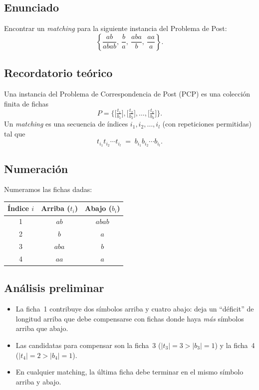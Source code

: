 \documentclass[11pt,a4paper]{article}
\theoremstyle{plain}
\theoremstyle{definition}
\theoremstyle{remark}
\begin{document}
\subsection*{Enunciado}

Encontrar un \emph{matching} para la siguiente instancia del Problema de
Post:
\[
  \left\{\frac{ab}{abab},\ \frac{b}{a},\ \frac{aba}{b},\ \frac{aa}{a}\right\}.
\]

\subsection*{Recordatorio te\'orico}

Una instancia del Problema de Correspondencia de Post (PCP) es una
colecci\'on finita de fichas
\[
  P=\Big\{\Big[\tfrac{t_1}{b_1}\Big],\Big[\tfrac{t_2}{b_2}\Big],\dots,
  \Big[\tfrac{t_k}{b_k}\Big]\Big\}.
\]
Un \emph{matching} es una secuencia de \'indices $i_1, i_2, \dots, i_l$
(con repeticiones permitidas) tal que
\[
  t_{i_1}t_{i_2}\cdots t_{i_l} \;=\; b_{i_1}b_{i_2}\cdots b_{i_l}.
\]

\subsection*{Numeraci\'on}

Numeramos las fichas dadas:

\begin{center}
\begin{tabular}{c|c|c}
\toprule
\'Indice $i$ & Arriba ($t_i$) & Abajo ($b_i$)\\
\midrule
1 & $ab$  & $abab$\\
2 & $b$   & $a$\\
3 & $aba$ & $b$\\
4 & $aa$  & $a$\\
\bottomrule
\end{tabular}
\end{center}

\subsection*{An\'alisis preliminar}

\begin{itemize}
  \item La ficha~1 contribuye dos s\'imbolos arriba y cuatro abajo: deja
        un ``d\'eficit'' de longitud arriba que debe compensarse con fichas
        donde haya \emph{m\'as} s\'imbolos arriba que abajo.
  \item Las candidatas para compensar son la ficha~3 ($|t_3|=3>|b_3|=1$)
        y la ficha~4 ($|t_4|=2>|b_4|=1$).
  \item En cualquier matching, la \'ultima ficha debe terminar en el mismo
        s\'imbolo arriba y abajo.
\end{itemize}
\end{document}

